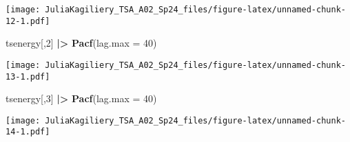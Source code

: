 \documentclass[
]{article}
\newenvironment{Shaded}{\begin{snugshade}}{\end{snugshade}}
\newcommand{\AttributeTok}[1]{\textcolor[rgb]{0.13,0.29,0.53}{#1}}
\newcommand{\DecValTok}[1]{\textcolor[rgb]{0.00,0.00,0.81}{#1}}
\newcommand{\FunctionTok}[1]{\textcolor[rgb]{0.13,0.29,0.53}{\textbf{#1}}}
\newcommand{\NormalTok}[1]{#1}
\newcommand{\SpecialCharTok}[1]{\textcolor[rgb]{0.81,0.36,0.00}{\textbf{#1}}}
\begin{document}
\texttt{[image: JuliaKagiliery\_TSA\_A02\_Sp24\_files/figure-latex/unnamed-chunk-12-1.pdf]}

\begin{Shaded}
\begin{Highlighting}[]
\NormalTok{tsenergy[,}\DecValTok{2}\NormalTok{] }\SpecialCharTok{|\textgreater{}}
  \FunctionTok{Pacf}\NormalTok{(}\AttributeTok{lag.max =} \DecValTok{40}\NormalTok{)}
\end{Highlighting}
\end{Shaded}

\texttt{[image: JuliaKagiliery\_TSA\_A02\_Sp24\_files/figure-latex/unnamed-chunk-13-1.pdf]}

\begin{Shaded}
\begin{Highlighting}[]
\NormalTok{tsenergy[,}\DecValTok{3}\NormalTok{] }\SpecialCharTok{|\textgreater{}}
  \FunctionTok{Pacf}\NormalTok{(}\AttributeTok{lag.max =} \DecValTok{40}\NormalTok{)}
\end{Highlighting}
\end{Shaded}

\texttt{[image: JuliaKagiliery\_TSA\_A02\_Sp24\_files/figure-latex/unnamed-chunk-14-1.pdf]}
\end{document}

